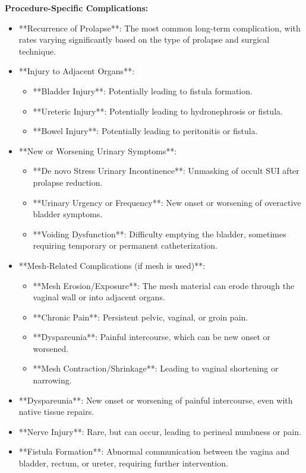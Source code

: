 \textbf{Procedure-Specific Complications:}
\begin{itemize}
  \item **Recurrence of Prolapse**: The most common long-term complication, with rates varying significantly based on the type of prolapse and surgical technique.
  \item **Injury to Adjacent Organs**:
    \begin{itemize}
      \item **Bladder Injury**: Potentially leading to fistula formation.
      \item **Ureteric Injury**: Potentially leading to hydronephrosis or fistula.
      \item **Bowel Injury**: Potentially leading to peritonitis or fistula.
    \end{itemize}
  \item **New or Worsening Urinary Symptoms**:
    \begin{itemize}
      \item **De novo Stress Urinary Incontinence**: Unmasking of occult SUI after prolapse reduction.
      \item **Urinary Urgency or Frequency**: New onset or worsening of overactive bladder symptoms.
      \item **Voiding Dysfunction**: Difficulty emptying the bladder, sometimes requiring temporary or permanent catheterization.
    \end{itemize}
  \item **Mesh-Related Complications (if mesh is used)**:
    \begin{itemize}
      \item **Mesh Erosion/Exposure**: The mesh material can erode through the vaginal wall or into adjacent organs.
      \item **Chronic Pain**: Persistent pelvic, vaginal, or groin pain.
      \item **Dyspareunia**: Painful intercourse, which can be new onset or worsened.
      \item **Mesh Contraction/Shrinkage**: Leading to vaginal shortening or narrowing.
    \end{itemize}
  \item **Dyspareunia**: New onset or worsening of painful intercourse, even with native tissue repairs.
  \item **Nerve Injury**: Rare, but can occur, leading to perineal numbness or pain.
  \item **Fistula Formation**: Abnormal communication between the vagina and bladder, rectum, or ureter, requiring further intervention.
\end{itemize}

